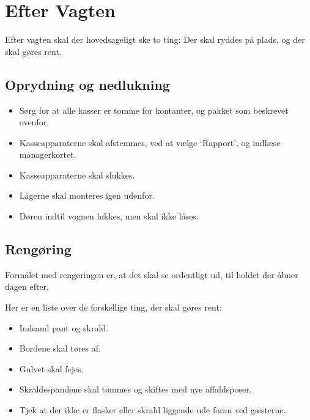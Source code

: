 \section{Efter Vagten}
\label{sec:post-barvagten}

Efter vagten skal der hovedsageligt ske to ting: Der skal ryddes på
plads, og der skal gøres rent.

\subsection{Oprydning og nedlukning}
\label{sec:post:oprydning}

\begin{itemize}
	\item Sørg for at alle kasser er tomme for kontanter, og pakket som beskrevet ovenfor.
	\item Kasseapparaterne skal afstemmes, ved at vælge `Rapport', og indlæse managerkortet.
	\item Kasseapparaterne skal slukkes.
	\item Lågerne skal monteres igen udenfor.
	\item Døren indtil vognen lukkes, men skal ikke låses.
\end{itemize}

\subsection{Rengøring}
\label{sec:post:rengoring}

Formålet med rengøringen er, at det skal se ordentligt ud, til 
holdet der åbner dagen efter.

Her er en liste over de forskellige ting, der skal gøres rent:
\begin{itemize}
	\item Indsaml pant og skrald.
	\item Bordene skal tøres af.
	\item Gulvet skal fejes.
	\item Skraldespandene skal tømmes og skiftes med nye affaldsposer.
	\item Tjek at der ikke er flasker eller skrald liggende ude foran ved gæsterne.
\end{itemize}
